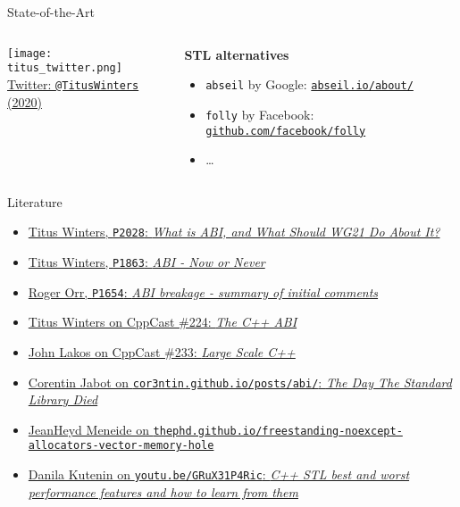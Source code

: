 \begin{frame}{State-of-the-Art}
    \begin{columns}
        \begin{column}{.4\textwidth}
            \centering
            \texttt{[image: titus\_twitter.png]}\\
            {\footnotesize \href{https://twitter.com/TitusWinters/status/1224377740306132998}{Twitter: \texttt{@TitusWinters} (2020)}}
        \end{column}
        \begin{column}{.5\textwidth}
            \textbf{STL alternatives}
            \begin{itemize}
                \item \texttt{abseil} by Google: \href{https://abseil.io/about/}{\texttt{abseil.io/about/}}
                \item \texttt{folly} by Facebook: \href{https://github.com/facebook/folly}{\texttt{github.com/facebook/folly}}
                \item \ldots
            \end{itemize}
        \end{column}
    \end{columns}
\end{frame}

\begin{frame}{Literature}
    \begin{itemize}
        \item \href{http://www.open-std.org/jtc1/sc22/wg21/docs/papers/2020/p2028r0.pdf}{Titus Winters, \texttt{P2028}: \textit{What is ABI, and What Should \href{http://www.open-std.org/jtc1/sc22/wg21/}{WG21} Do About It?}}
        \item \href{http://www.open-std.org/jtc1/sc22/wg21/docs/papers/2020/p1863r1.pdf}{Titus Winters, \texttt{P1863}: \textit{ABI - Now or Never}}
        \item \href{http://open-std.org/JTC1/SC22/WG21/docs/papers/2020/p1654r1.html}{Roger Orr, \texttt{P1654}: \textit{ABI breakage - summary of initial comments}}
        \item \href{https://cppcast.com/titus-winters-abi/}{Titus Winters on CppCast \#224: \textit{The C++ ABI}}
        \item \href{https://cppcast.com/john-lakos-large-scale-cpp/}{John Lakos on CppCast \#233: \textit{Large Scale C++}}
        \item \href{https://cor3ntin.github.io/posts/abi/}{Corentin Jabot on \texttt{cor3ntin.github.io/posts/abi/}: \textit{The Day The Standard Library Died}}
        \item \href{https://thephd.github.io/freestanding-noexcept-allocators-vector-memory-hole}{JeanHeyd Meneide on \texttt{thephd.github.io/freestanding-noexcept-allocators-vector-memory-hole}}
        \item \href{https://youtu.be/GRuX31P4Ric}{Danila Kutenin on \texttt{youtu.be/GRuX31P4Ric}: \textit{C++ STL best and worst performance features and how to learn from them}}
    \end{itemize}
\end{frame}
